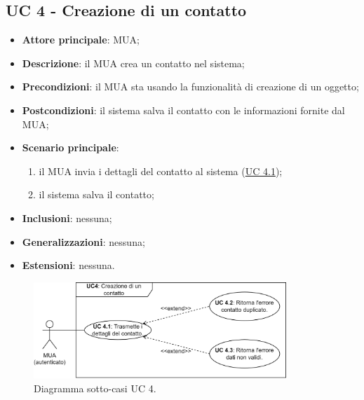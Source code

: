 \subsection{UC 4 - Creazione di un contatto} \label{sec:UC4}
    \begin{itemize}
        \item \textbf{Attore principale}: MUA;
        \item \textbf{Descrizione}: il MUA crea un contatto nel sistema;
        \item \textbf{Precondizioni}: il MUA sta usando la funzionalità di creazione di un oggetto;
        \item \textbf{Postcondizioni}: il sistema salva il contatto con le informazioni fornite dal MUA;
        \item \textbf{Scenario principale}:
            \begin{enumerate}
                \item il MUA invia i dettagli del contatto al sistema (\hyperref[sec:UC4.1]{UC 4.1});
                \item il sistema salva il contatto;
            \end{enumerate}
        \item \textbf{Inclusioni}: nessuna;
        \item \textbf{Generalizzazioni}: nessuna;
        \item \textbf{Estensioni}: nessuna.
    \end{itemize}

\begin{figure}[h]
    \includegraphics[width=0.85\textwidth]{sections/uc_imgs/UC04.X.png}
    \centering
    \caption{Diagramma sotto-casi UC 4.}
\end{figure}

